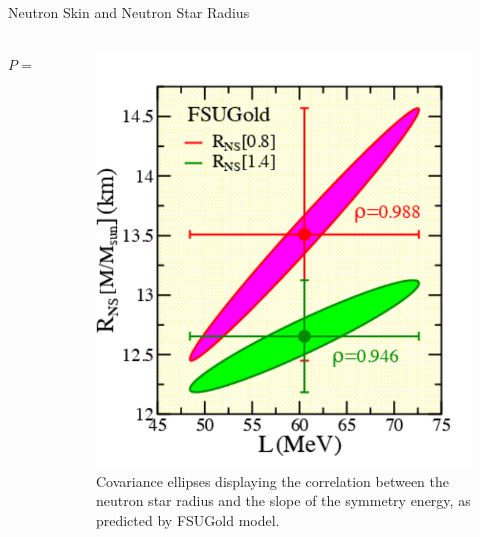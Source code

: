 \documentclass[9pt,a4paper]{beamer}
\begin{document}
\begin{frame}[noframenumbering]{Neutron Skin and Neutron Star Radius}
\begin{columns}[T]
\begin{column}{.5\textwidth}
 \begin{equation}
 P = \frac{1}{3} \rho_{0} L
 \end{equation}
\end{column}
\begin{column}{.5\textwidth}
\begin{figure}
\centering
\includegraphics[scale=0.50]{figures/LvsRns.pdf}
\caption{Covariance ellipses displaying the correlation between the neutron star radius and the slope of the symmetry energy, as predicted by FSUGold model.}
\end{figure}
\end{column}
\end{columns}
\end{frame}
\end{document}
